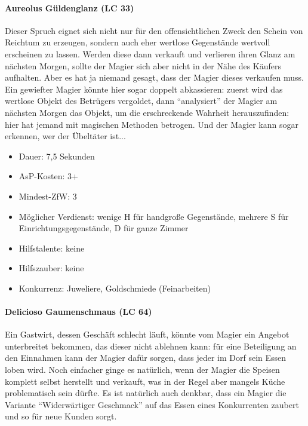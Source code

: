 \paragraph{Aureolus Güldenglanz (LC 33)}
Dieser Spruch eignet sich nicht nur für den offensichtlichen Zweck den Schein von Reichtum zu erzeugen, sondern auch eher wertlose Gegenstände wertvoll erscheinen zu lassen. Werden diese dann verkauft und verlieren ihren Glanz am nächsten Morgen, sollte der Magier sich aber nicht in der Nähe des Käufers aufhalten. Aber es hat ja niemand gesagt, dass der Magier dieses verkaufen muss. Ein gewiefter Magier könnte hier sogar doppelt abkassieren: zuerst wird das wertlose Objekt des Betrügers vergoldet, dann \enquote{analysiert} der Magier am nächsten Morgen das Objekt, um die erschreckende Wahrheit herauszufinden: hier hat jemand mit magischen Methoden betrogen. Und der Magier kann sogar erkennen, wer der Übeltäter ist...
\begin{itemize}
	\item Dauer: 7,5 Sekunden
	\item AsP-Kosten: 3+
	\item Mindest-ZfW: 3
	\item Möglicher Verdienst: wenige H für handgroße Gegenstände, mehrere S für Einrichtungsgegenstände, D für ganze Zimmer
	\item Hilfstalente: keine
	\item Hilfszauber: keine
	\item Konkurrenz: Juweliere, Goldschmiede (Feinarbeiten)
\end{itemize}

\paragraph{Delicioso Gaumenschmaus (LC 64)}
Ein Gastwirt, dessen Geschäft schlecht läuft, könnte vom Magier ein Angebot unterbreitet bekommen, das dieser nicht ablehnen kann: für eine Beteiligung an den Einnahmen kann der Magier dafür sorgen, dass jeder im Dorf sein Essen loben wird. Noch einfacher ginge es natürlich, wenn der Magier die Speisen komplett selbst herstellt und verkauft, was in der Regel aber mangels Küche problematisch sein dürfte. Es ist natürlich auch denkbar, dass ein Magier die Variante \enquote{Widerwärtiger Geschmack} auf das Essen eines Konkurrenten zaubert und so für neue Kunden sorgt.

